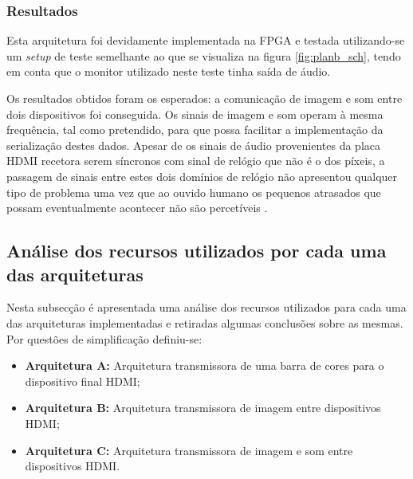 \subsubsection*{Resultados}



Esta arquitetura foi devidamente implementada na FPGA e testada utilizando-se um \textit{setup} de teste semelhante ao que se visualiza na figura \ref{fig:planb_sch}, tendo em conta que o monitor utilizado neste teste tinha saída de áudio. 


Os resultados obtidos foram os esperados: a comunicação de imagem e som entre dois dispositivos foi conseguida. Os sinais de imagem e som operam à mesma frequência, tal como pretendido, para que possa facilitar a implementação da serialização destes dados. Apesar de os sinais de áudio provenientes da placa HDMI recetora serem síncronos com sinal de relógio que não é o dos píxeis, a passagem de sinais entre estes dois domínios de relógio não apresentou qualquer tipo de problema uma vez que ao ouvido humano os pequenos atrasados que possam eventualmente acontecer não são percetíveis .


\begin{center}
\end{center}


\subsection{Análise dos recursos utilizados por cada uma das arquiteturas}

Nesta subsecção é apresentada uma análise dos recursos utilizados para cada uma das arquiteturas implementadas e retiradas algumas conclusões sobre as mesmas. 
Por questões de simplificação definiu-se:
\begin{itemize}
	\item \textbf{Arquitetura A:} Arquitetura transmissora de uma barra de cores para o dispositivo final HDMI;
	\item \textbf{Arquitetura B:} Arquitetura transmissora de imagem entre dispositivos HDMI;
	\item \textbf{Arquitetura C:} Arquitetura transmissora de imagem e som entre dispositivos HDMI.
\end{itemize}

